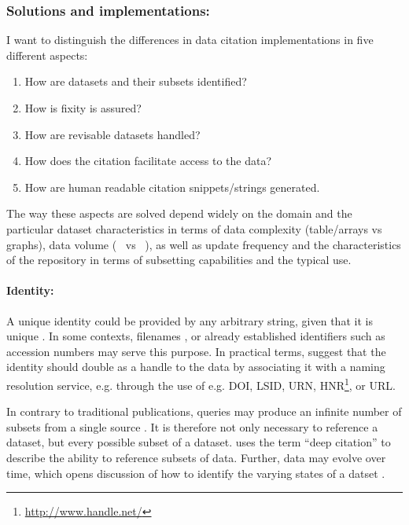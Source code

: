 \documentclass[a4paper,10pt]{article}
\begin{document}
\newpage
\subsubsection{Solutions and implementations:}
I want to distinguish the differences in data citation implementations in five different aspects:

\begin{enumerate}
 \item How are datasets and their subsets identified? 
 \item How is fixity is assured? 
 \item How are revisable datasets handled? 
 \item How does the citation facilitate access to the data? 
 \item How are human readable citation snippets/strings generated.
\end{enumerate}

The way these aspects are solved depend widely on the domain and the particular dataset characteristics in terms of data complexity (table/arrays vs graphs), data volume (\si{\kilo\byte} vs \si{\peta\byte}), as well as update frequency and the characteristics of the repository in terms of subsetting capabilities and the typical use.

\paragraph{Identity:}
A unique identity could be provided by any arbitrary string, given that it is unique \citep{CODATA2013}. In some contexts, filenames \citep{Buneman2016}, or already established identifiers such as accession numbers \citep{Bandrowski2016} may serve this purpose. 
In practical terms, \cite{AltKin07} suggest that the identity should double as a handle to the data by associating it with a naming resolution service, e.g. through the use of e.g. \gls{DOI},  \gls{LSID}, \gls{URN}, \gls{HNR}\footnote{\url{http://www.handle.net/}}, or \gls{URL}. 

In contrary to traditional publications, queries may produce an infinite number of subsets from a single source \citep{Davidson2017, CODATA2013}. It is therefore not only necessary to reference a dataset, but every possible subset of a dataset. \cite{AltKin07} uses the term ``deep citation'' to describe the ability to reference subsets of data. 
Further, data may evolve over time, which opens discussion of how to identify the varying states of a datset \citep{Huber2015}.
\end{document}
